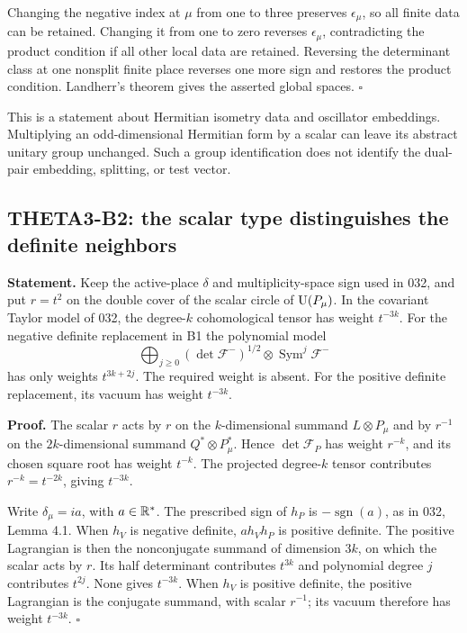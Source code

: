 \documentclass[11pt]{article}
\theoremstyle{definition}\newtheorem{definition}[theorem]{Definition}\newtheorem{remark}[theorem]{Remark}
\begin{document}
Changing the negative index at $\mu$ from one to three preserves $\epsilon_\mu$, so all finite data can be retained. Changing it from one to zero reverses $\epsilon_\mu$, contradicting the product condition if all other local data are retained. Reversing the determinant class at one nonsplit finite place reverses one more sign and restores the product condition. Landherr's theorem gives the asserted global spaces. \hfill$\square$

This is a statement about Hermitian isometry data and oscillator embeddings. Multiplying an odd-dimensional Hermitian form by a scalar can leave its abstract unitary group unchanged. Such a group identification does not identify the dual-pair embedding, splitting, or test vector.

\subsection{THETA3-B2: the scalar type distinguishes the definite neighbors}\label{B2}

\textbf{Statement.} Keep the active-place $\delta$ and multiplicity-space sign used in 032, and put $r=t^2$ on the double cover of the scalar circle of $\operatorname{U}(P_\mu)$. In the covariant Taylor model of 032, the degree-$k$ cohomological tensor has weight $t^{-3k}$. For the negative definite replacement in B1 the polynomial model
\[
 \bigoplus_{j\geq0}(\det\mathcal F^-)^{1/2}\otimes
                    \operatorname{Sym}^j\mathcal F^-
\]
has only weights $t^{3k+2j}$. The required weight is absent. For the positive definite replacement, its vacuum has weight $t^{-3k}$.

\textbf{Proof.} The scalar $r$ acts by $r$ on the $k$-dimensional summand $L\otimes P_\mu$ and by $r^{-1}$ on the $2k$-dimensional summand $Q^*\otimes P_\mu^*$. Hence $\det\mathcal F_P$ has weight $r^{-k}$, and its chosen square root has weight $t^{-k}$. The projected degree-$k$ tensor contributes $r^{-k}=t^{-2k}$, giving $t^{-3k}$.

Write $\delta_\mu=ia$, with $a\in\mathbb R^*$. The prescribed sign of $h_P$ is $-\operatorname{sgn}(a)$, as in 032, Lemma 4.1. When $h_V$ is negative definite, $a h_Vh_P$ is positive definite. The positive Lagrangian is then the nonconjugate summand of dimension $3k$, on which the scalar acts by $r$. Its half determinant contributes $t^{3k}$ and polynomial degree $j$ contributes $t^{2j}$. None gives $t^{-3k}$. When $h_V$ is positive definite, the positive Lagrangian is the conjugate summand, with scalar $r^{-1}$; its vacuum therefore has weight $t^{-3k}$. \hfill$\square$
\end{document}

